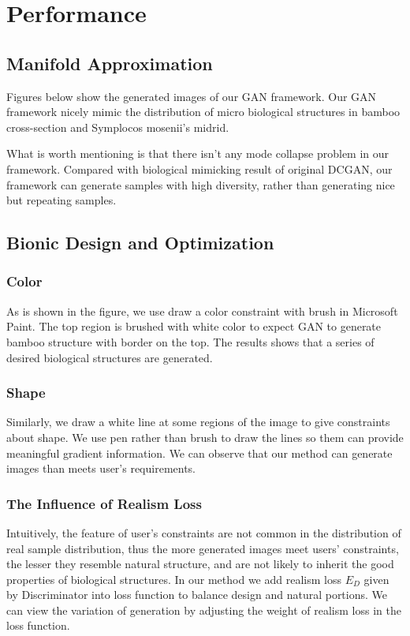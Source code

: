 \section{Performance}

\subsection{Manifold Approximation}

Figures below show the generated images of our GAN framework. Our GAN framework nicely mimic the distribution of micro biological structures in bamboo cross-section and Symplocos mosenii’s midrid.

What is worth mentioning is that there isn’t any mode collapse problem in our framework. Compared with biological mimicking result of original DCGAN, our framework can generate samples with high diversity, rather than generating nice but repeating samples. 
\subsection{Bionic Design and Optimization}
\subsubsection{Color}

As is shown in the figure, we use draw a color constraint with brush in Microsoft Paint. The top region is brushed with white color to expect GAN to generate bamboo structure with border on the top. The results shows that a series of desired biological structures are generated. 

\subsubsection{Shape}

Similarly, we draw a white line at some regions of the image to give constraints about shape. We use pen rather than brush to draw the lines so them can provide meaningful gradient information. We can observe that our method can generate images than meets user’s requirements.

\subsubsection{The Influence of Realism Loss}

Intuitively, the feature of user’s constraints are not common in the distribution of real sample distribution, thus the more generated images meet users’ constraints, the lesser they resemble natural structure, and are not likely to inherit the good properties of biological structures. In our method we add realism loss $E_D$ given by Discriminator into loss function to balance design and natural portions. We can view the variation of generation by adjusting the weight of realism loss in the loss function.

